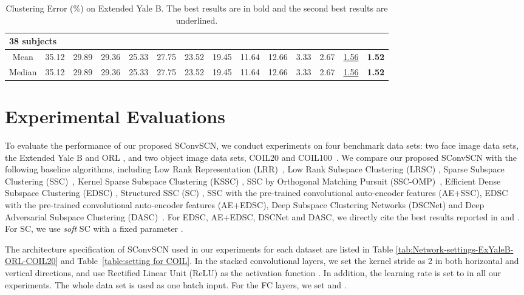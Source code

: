 \documentclass[10pt,twocolumn,letterpaper]{article}
\begin{document}
\begin{table*}[t]
\begin{tabular}{c|c c c c c c c c c c c |c c}
\multicolumn{12}{l}{\textbf{38 subjects}} \\
\hline
Mean   &35.12 &29.89 & 29.36& 25.33& 27.75   & 23.52  &19.45      &11.64 &12.66 &3.33& 2.67 & \underline{1.56} & \textbf{1.52} \\ Median &35.12 &29.89 & 29.36& 25.33& 27.75& 23.52 &19.45      & 11.64 &12.66& 3.33& 2.67 & \underline{1.56} &\textbf{1.52} \\ \hline
\end{tabular}
\caption{Clustering Error (\%) on Extended Yale B. The best results are in bold and the second best results are underlined.} \label{table:extendedYaleB-DS3C}
\end{table*}


\section{Experimental Evaluations}
\label{sec:experiments}

To evaluate the performance of our proposed SConvSCN, we conduct experiments on four benchmark data sets: two face image data sets, the Extended Yale B \cite{Georghiades:TPAMI01} and ORL \cite{Sam:94}, and two object image data sets, COIL20 and COIL100~\cite{Nene:COIL}.
We compare our proposed SConvSCN with the following baseline algorithms, including Low Rank Representation (LRR)~\cite{Liu:ICML10}, Low Rank Subspace Clustering (LRSC) \cite{ReVidal:PRL14},
Sparse Subspace Clustering (SSC)~\cite{Elham:TPAMI13}, Kernel Sparse Subspace Clustering (KSSC) \cite{Patel:ICIP14}, SSC by Orthogonal Matching Pursuit (SSC-OMP)~\cite{You:CVPR16}, Efficient Dense Subspace Clustering (EDSC) \cite{Ji:WACV14},
Structured SSC (SC) \cite{Li:TIP17}, SSC with the pre-trained convolutional auto-encoder features (AE+SSC), EDSC with the pre-trained convolutional auto-encoder features (AE+EDSC), Deep Subspace Clustering Networks (DSCNet) \cite{Ji:NIPS17} and Deep Adversarial Subspace Clustering (DASC)~\cite{Zhou:CVPR18}. For EDSC, AE+EDSC, DSCNet and DASC, we directly cite the best results reported in \cite{Ji:NIPS17} and \cite{Zhou:CVPR18}. For SC, we use {\em soft} SC with a fixed parameter .

The architecture specification of SConvSCN used in our experiments for each dataset are listed in Table \ref{tab:Network-settings-ExYaleB-ORL-COIL20} and Table~\ref{table:setting for COIL}. In the stacked convolutional layers, we set the kernel stride as 2 in both horizontal and vertical directions, and use Rectified Linear Unit (ReLU) \cite{Krizhevsky:NIPS2012} as the activation function . In addition, the learning rate is set to  in all our experiments. The whole data set is used as one batch input. For the FC layers, we set  and .
\end{document}
